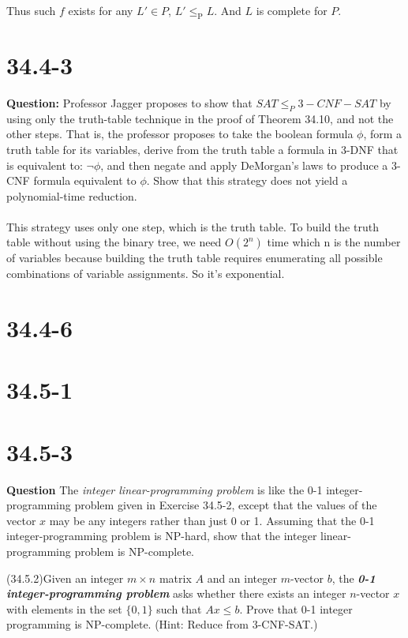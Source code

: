 \documentclass[12pt]{article}
\begin{document}
Thus such $f$ exists for any $L' \in P$, $L' \le_\text{P} L$. And $L$ is complete for $P$.

\section{34.4-3}
\textbf{Question: }Professor Jagger proposes to show that \(SAT \leq_P 3-CNF-SAT \) by using only the truth-table technique in the proof of Theorem 34.10, and not the other steps. That is, the professor proposes to take the boolean formula \(\phi\), form a truth table for its variables, derive from the truth table a formula in 3-DNF that is equivalent
to: \(\lnot\phi\), and then negate and apply DeMorgan’s laws to produce a 3-CNF formula
equivalent to \(\phi\). Show that this strategy does not yield a polynomial-time reduction.
\\
\\
This strategy uses only one step, which is the truth table. To build the truth table without using the binary tree, we need \(O(2^n)\) time which n is the number of variables because building the truth table requires enumerating all possible combinations of variable assignments. So it's exponential.

\section{34.4-6}

\section{34.5-1}

\section{34.5-3}
\textbf{Question}
The \textit{integer linear-programming problem} is like the 0-1 integer-programming problem given in Exercise 34.5-2, except that the values of the vector $x$ may be any integers rather than just 0 or 1. Assuming that the 0-1 integer-programming problem is NP-hard, show that the integer linear-programming problem is NP-complete.

(34.5.2)Given an integer $m \times n$ matrix $A$ and an integer $m$-vector $b$, the \textbf{\textit{0-1 integer-programming problem}} asks whether there exists an integer $n$-vector $x$ with elements in the set $\{0, 1\}$ such that $Ax \le b$. Prove that 0-1 integer programming is NP-complete. (Hint: Reduce from 3-CNF-SAT.)
\end{document}
